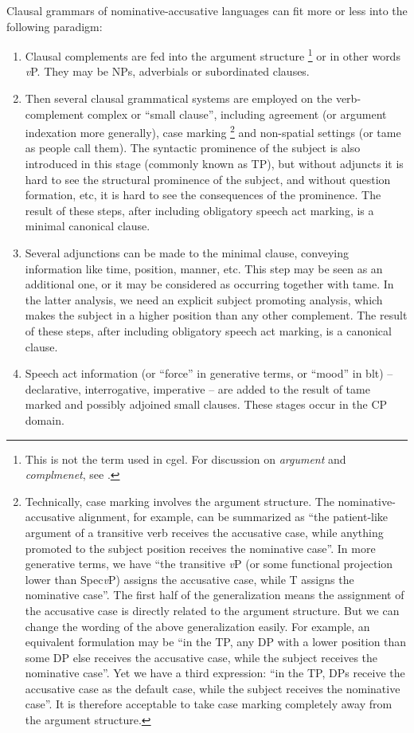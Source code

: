 \documentclass{article}
\newcommand*{\term}[1]{\emph{#1}}
\newcommand*{\vP}{\textit{v}P}
\begin{document}
Clausal grammars of nominative-accusative languages can fit more or less into the following paradigm:
\begin{enumerate}
    \item Clausal complements are fed into the argument structure%
    \footnote{
        This is not the term used in \ac{cgel}.
        For discussion on \term{argument} and \term{complmenet}, see .
    } or in other words \vP. 
    They may be NPs, adverbials or subordinated clauses.
    \item Then several clausal grammatical systems are employed on the verb-complement complex or ``small clause'',
    including agreement (or argument indexation more generally), case marking%
    \footnote{
        Technically, case marking involves the argument structure.
        The nominative-accusative alignment, for example, 
        can be summarized as ``the patient-like argument of a transitive verb receives the accusative case,
        while anything promoted to the subject position receives the nominative case''.
        In more generative terms, we have 
        ``the transitive \vP{} (or some functional projection lower than Spec\vP) assigns the accusative case,
        while T assigns the nominative case''. 
        The first half of the generalization
        means the assignment of the accusative case is directly related to the argument structure.
        But we can change the wording of the above generalization easily.
        For example, an equivalent formulation may be 
        ``in the TP, any DP with a lower position than some DP else receives the accusative case, 
        while the subject receives the nominative case''.
        Yet we have a third expression: 
        ``in the TP, DPs receive the accusative case as the default case,
        while the subject receives the nominative case''.
        It is therefore acceptable to take case marking completely away from the argument structure.
    }
    and non-spatial settings (or \ac{tame} as people call them).
    The syntactic prominence of the subject is also introduced in this stage (commonly known as TP), 
    but without adjuncts it is hard to see the structural prominence of the subject,
    and without question formation, etc, it is hard to see the consequences of the prominence.
    The result of these steps, after including obligatory speech act marking,
    is a minimal canonical clause.
    \item Several adjunctions can be made to the minimal clause, 
    conveying information like time, position, manner, etc. 
    This step may be seen as an additional one,
    or it may be considered as occurring together with \ac{tame}.
    In the latter analysis, we need an explicit subject promoting analysis,
    which makes the subject in a higher position than any other complement.
    The result of these steps, after including obligatory speech act marking, 
    is a canonical clause.
    \item Speech act information 
    (or ``force'' in generative terms, or ``mood'' in \ac{blt}) 
    -- declarative, interrogative, imperative -- are added to the result of 
    \ac{tame} marked and possibly adjoined small clauses. 
    These stages occur in the CP domain.


\end{enumerate}
\end{document}
